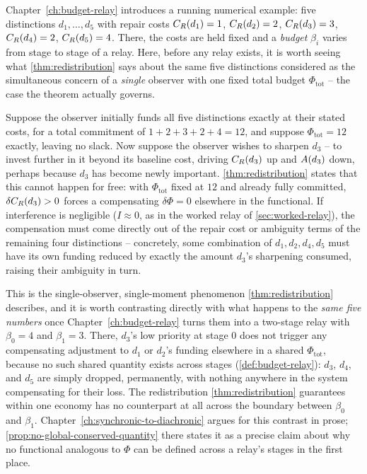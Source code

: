 Chapter~\ref{ch:budget-relay} introduces a running numerical example: five
distinctions $d_1, \ldots, d_5$ with repair costs $C_R(d_1)=1$,
$C_R(d_2)=2$, $C_R(d_3)=3$, $C_R(d_4)=2$,
$C_R(d_5)=4$. There, the costs are held fixed and a \emph{budget}
$\beta_i$ varies from stage to stage of a relay. Here, before any relay
exists, it is worth seeing what \cref{thm:redistribution} says about the
same five distinctions considered as the simultaneous concern of a
\emph{single} observer with one fixed total budget
$\Phi_{\mathrm{tot}}$ -- the case the theorem actually governs.

Suppose the observer initially funds all five distinctions exactly at
their stated costs, for a total commitment of $1+2+3+2+4 = 12$, and
suppose $\Phi_{\mathrm{tot}} = 12$ exactly, leaving no slack. Now suppose
the observer wishes to sharpen $d_3$ -- to invest further in it beyond its
baseline cost, driving $C_R(d_3)$ up and $A(d_3)$ down, perhaps
because $d_3$ has become newly important. \cref{thm:redistribution}
states that this cannot happen for free: with $\Phi_{\mathrm{tot}}$ fixed
at $12$ and already fully committed, $\delta C_R(d_3) > 0$ forces a
compensating $\delta \Phi = 0$ elsewhere in the functional. If
interference is negligible ($I \approx 0$, as in the worked relay of
\cref{sec:worked-relay}), the compensation must come directly out of the
repair cost or ambiguity terms of the remaining four distinctions --
concretely, some combination of $d_1, d_2, d_4, d_5$ must have its own
funding reduced by exactly the amount $d_3$'s sharpening consumed, raising
their ambiguity in turn.

This is the single-observer, single-moment phenomenon
\cref{thm:redistribution} describes, and it is worth contrasting directly
with what happens to the \emph{same five numbers} once
Chapter~\ref{ch:budget-relay} turns them into a two-stage relay with
$\beta_0 = 4$ and $\beta_1 = 3$. There, $d_3$'s low priority at stage $0$
does not trigger any compensating adjustment to $d_1$ or $d_2$'s funding
elsewhere in a shared $\Phi_{\mathrm{tot}}$, because no such shared
quantity exists across stages (\cref{def:budget-relay}): $d_3$, $d_4$, and
$d_5$ are simply dropped, permanently, with nothing anywhere in the
system compensating for their loss. The redistribution
\cref{thm:redistribution} guarantees within one economy has no
counterpart at all across the boundary between $\beta_0$ and $\beta_1$.
Chapter~\ref{ch:synchronic-to-diachronic} argues for this contrast in
prose; \cref{prop:no-global-conserved-quantity} there states it as a
precise claim about why no functional analogous to $\Phi$ can be defined
across a relay's stages in the first place.
